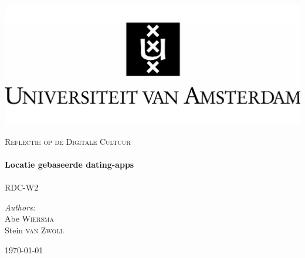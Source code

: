 \begin{titlepage}

\begin{flushleft}
\includegraphics[trim=23mm 0mm 0mm 0mm, width=1\textwidth]{./logo.jpg}\\[1cm] \end{flushleft}
\begin{center}
	\textsc{\Large Reflectie op de Digitale Cultuur}\\[0.5cm]

    \HRule \\[0.4cm] { \huge \bfseries Locatie gebaseerde dating-apps}\\[0.4cm]

    \HRule \\[1.5cm]
    RDC-W2

\begin{minipage}{0.4\textwidth}
\begin{flushleft} \large \emph{Authors:}\\
Abe \textsc{Wiersma}\\
Stein \textsc{van Zwoll}\\
\end{flushleft}
\end{minipage}
\begin{minipage}{0.4\textwidth} \begin{flushright} \large \end{flushright}\end{minipage}

    \vfill

    {\large \today}

\end{center}
\end{titlepage}
\pagebreak